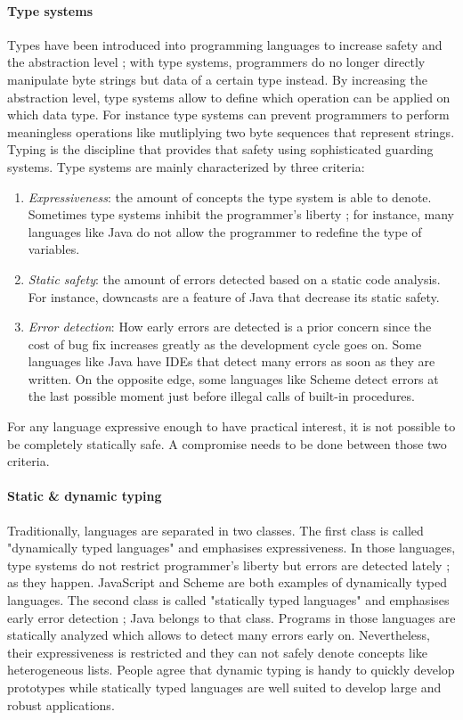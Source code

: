 \documentclass[a4paper]{report}
\begin{document}
\paragraph{Type systems} Types have been introduced into programming languages to increase safety and the abstraction level ; with type systems, programmers do no longer directly manipulate byte strings but data of a certain type instead. By increasing the abstraction level, type systems allow to define which operation can be applied on which data type. For instance type systems can prevent programmers to perform meaningless operations like mutliplying two byte sequences that represent strings. Typing is the discipline that provides that safety using sophisticated guarding systems. Type systems are mainly characterized by three criteria:
\begin{enumerate}
\item \emph{Expressiveness}: the amount of concepts the type system is able to denote. Sometimes type systems inhibit the programmer's liberty ; for instance, many languages like Java do not allow the programmer to redefine the type of variables.
\item \emph{Static safety}: the amount of errors detected based on a static code analysis. For instance, downcasts are a feature of Java that decrease its static safety.
\item \emph{Error detection}: How early errors are detected is a prior concern since the cost of bug fix increases greatly as the development cycle goes on. Some languages like Java have IDEs that detect many errors as soon as they are written. On the opposite edge, some languages like Scheme detect errors at the last possible moment just before illegal calls of built-in procedures.
\end{enumerate}
For any language expressive enough to have practical interest, it is not possible to be completely statically safe. A compromise needs to be done between those two criteria.

\paragraph{Static \& dynamic typing} Traditionally, languages are separated in two classes. The first class is called "dynamically typed languages" and emphasises expressiveness. In those languages, type systems do not restrict programmer's liberty but errors are detected lately ; as they happen. JavaScript and Scheme are both examples of dynamically typed languages. The second class is called "statically typed languages" and emphasises early error detection ; Java belongs to that class. Programs in those languages are statically analyzed which allows to detect many errors early on. Nevertheless, their expressiveness is restricted and they can not safely denote concepts like heterogeneous lists. People agree that dynamic typing is handy to quickly develop prototypes while statically typed languages are well suited to develop large and robust applications.
\end{document}
